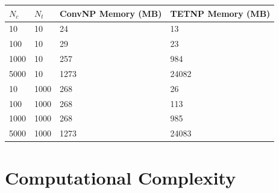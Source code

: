 \documentclass[../../main.tex]{subfiles}
\begin{document}
\begin{table}[]
    \begin{tabular}{@{}llll@{}}
    \toprule
    $N_c$ & $N_t$ & ConvNP Memory (MB) & TETNP Memory (MB) \\ \midrule
    10    & 10    & 24                 & 13                \\
    100   & 10    & 29                 & 23                \\
    1000  & 10    & 257                & 984               \\
    5000  & 10    & 1273               & 24082             \\ \midrule
    10    & 1000  & 268                & 26                \\
    100   & 1000  & 268                & 113               \\
    1000  & 1000  & 268                & 985               \\
    5000  & 1000  & 1273               & 24083             \\ \bottomrule
    \end{tabular}
    \end{table}


\section{Computational Complexity}


\ifSubfilesClassLoaded{%
    \printbibliography{}
}{} 
\end{document}
